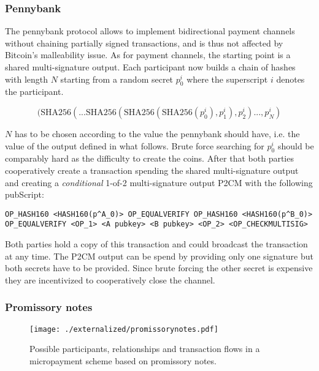 \subsubsection{Pennybank}

The pennybank protocol allows to implement bidirectional payment channels without chaining partially signed transactions, and is thus not affected by Bitcoin's malleability issue. As for payment channels, the starting point is a shared multi-signature output. Each participant now builds a chain of hashes with length $N$ starting from a random secret $p^i_0$ where the superscript $i$ denotes the participant. 

\begin{equation*}
(\text{SHA256}(... \text{SHA256}(\text{SHA256}(\text{SHA256}(p^i_0),p^i_1),p^i_2)...,p^i_N)
\end{equation*}

$N$ has to be chosen according to the value the pennybank should have, i.e. the value of the output defined in what follows. Brute force searching for $p^i_0$ should be comparably hard as the difficulty to create the coins.  After that both parties cooperatively create a transaction spending the shared multi-signature output and creating a \emph{conditional} 1-of-2 multi-signature output P2CM with the following pubScript:

\begin{lstlisting}
OP_HASH160 <HASH160(p^A_0)> OP_EQUALVERIFY OP_HASH160 <HASH160(p^B_0)> OP_EQUALVERIFY <OP_1> <A pubkey> <B pubkey> <OP_2> <OP_CHECKMULTISIG>
\end{lstlisting}

Both parties hold a copy of this transaction and could broadcast the transaction at any time. The P2CM output can be spend by providing only one signature but both secrets have to be provided. Since brute forcing the other secret is expensive they are incentivized to cooperatively close the channel.


\subsubsection{Promissory notes}

\cite{strawpay}
\cite{filament}

\begin{figure}
\centering
\texttt{[image: ./externalized/promissorynotes.pdf]}
\caption{Possible participants, relationships and transaction flows in a micropayment scheme based on promissory notes.}
\label{fig:promissorynotes}
\end{figure}


